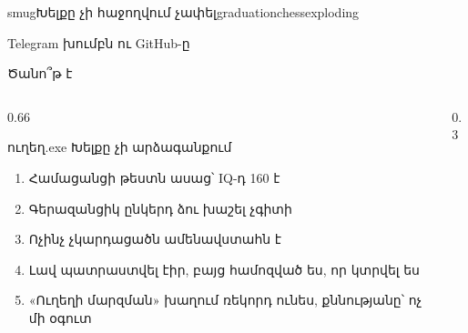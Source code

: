 
%
  {    }%
  {smug}{Խելքը չի հաջողվում չափել}{{graduation}{chess}{exploding}}

\begin{frame}{Telegram խումբն ու GitHub-ը}
  \telegramframebody
\end{frame}

\begin{frame}{Ծանո՞թ է}
  \begin{columns}[c]
    \begin{column}{0.66\textwidth}
      \begin{popup}{ուղեղ.exe}
        {\blackfont Խելքը չի արձագանքում}\par\smallskip
        \begin{enumerate}\small
          \item<2-> Համացանցի թեստն ասաց՝ IQ-դ 160 է
          \item<3-> Գերազանցիկ ընկերդ ձու խաշել չգիտի
          \item<4-> Ոչինչ չկարդացածն ամենավստահն է
          \item<5-> Լավ պատրաստվել էիր, բայց համոզված ես, որ կտրվել ես
          \item<6-> «Ուղեղի մարզման» խաղում ռեկորդ ունես, քննությանը՝ ոչ մի օգուտ
        \end{enumerate}
      \end{popup}
    \end{column}
    \begin{column}{0.3\textwidth}
      \centering
      \par\medskip
    \end{column}
  \end{columns}
\end{frame}

